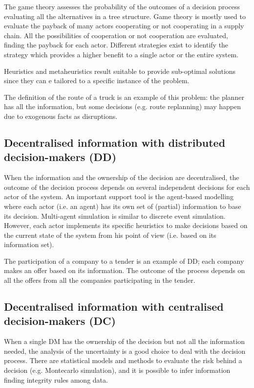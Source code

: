 The game theory assesses the probability of the outcomes of a decision process evaluating all the alternatives in a tree structure. Game theory is mostly used to evaluate the payback of many actors cooperating or not cooperating in a supply chain. All the possibilities of cooperation or not cooperation are evaluated, finding the payback for each actor. Different strategies exist to identify the strategy which provides a higher benefit to a single actor or the entire system.\par

Heuristics and metaheuristics result suitable to provide sub-optimal solutions since they can e tailored to a specific instance of the problem.\par

The definition of the route of a truck is an example of this problem: the planner has all the information, but some decisions (e.g. route replanning) may happen due to exogenous facts as disruptions. 

\subsection{Decentralised information with distributed decision-makers (DD)}

When the information and the ownership of the decision are decentralised, the outcome of the decision process depends on several independent decisions for each actor of the system. An important support tool is the agent-based modelling where each actor (i.e. an agent) has its own set of (partial) information to base its decision. Multi-agent simulation is similar to discrete event simulation. However, each actor implements its specific heuristics to make decisions based on the current state of the system from his point of view (i.e. based on its information set). \par

The participation of a company to a tender is an example of DD; each company makes an offer based on its information. The outcome of the process depends on all the offers from all the companies participating in the tender.

\subsection{Decentralised information with centralised decision-makers (DC)}
When a single DM has the ownership of the decision but not all the information needed, the analysis of the uncertainty is a good choice to deal with the decision process. There are statistical models and methods to evaluate the risk behind a decision (e.g. Montecarlo simulation), and it is possible to infer information finding integrity rules among data. \par

